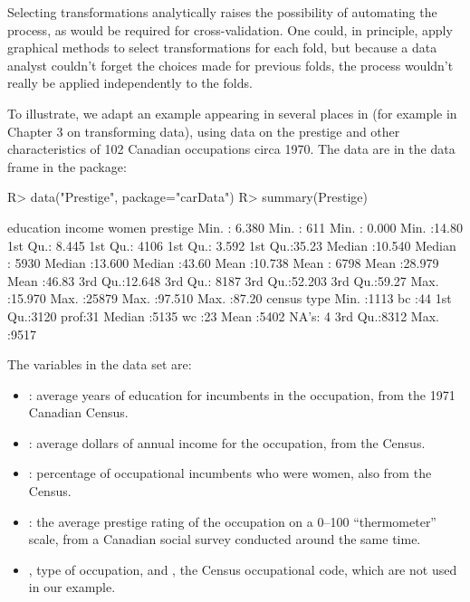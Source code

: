 \documentclass[
]{jss}
\providecommand{\tightlist}{%
  \setlength{\itemsep}{0pt}\setlength{\parskip}{0pt}}
\begin{document}
Selecting transformations analytically raises the possibility of
automating the process, as would be required for cross-validation. One
could, in principle, apply graphical methods to select transformations
for each fold, but because a data analyst couldn't forget the choices
made for previous folds, the process wouldn't really be applied
independently to the folds.

To illustrate, we adapt an example appearing in several places in
\citet{FoxWeisberg:2019} (for example in Chapter 3 on transforming
data), using data on the prestige and other characteristics of 102
Canadian occupations circa 1970. The data are in the 
data frame in the  package:

\begin{CodeChunk}
\begin{CodeInput}
R> data("Prestige", package="carData")
R> summary(Prestige)
\end{CodeInput}
\begin{CodeOutput}
   education          income          women           prestige    
 Min.   : 6.380   Min.   :  611   Min.   : 0.000   Min.   :14.80  
 1st Qu.: 8.445   1st Qu.: 4106   1st Qu.: 3.592   1st Qu.:35.23  
 Median :10.540   Median : 5930   Median :13.600   Median :43.60  
 Mean   :10.738   Mean   : 6798   Mean   :28.979   Mean   :46.83  
 3rd Qu.:12.648   3rd Qu.: 8187   3rd Qu.:52.203   3rd Qu.:59.27  
 Max.   :15.970   Max.   :25879   Max.   :97.510   Max.   :87.20  
     census       type   
 Min.   :1113   bc  :44  
 1st Qu.:3120   prof:31  
 Median :5135   wc  :23  
 Mean   :5402   NA's: 4  
 3rd Qu.:8312            
 Max.   :9517            
\end{CodeOutput}
\end{CodeChunk}

The variables in the  data set are:

\begin{itemize}
\tightlist
\item
  : average years of education for incumbents in the
  occupation, from the 1971 Canadian Census.
\item
  : average dollars of annual income for the occupation,
  from the Census.
\item
  : percentage of occupational incumbents who were women,
  also from the Census.
\item
  : the average prestige rating of the occupation on a
  0--100 ``thermometer'' scale, from a Canadian social survey conducted
  around the same time.
\item
  , type of occupation, and , the Census
  occupational code, which are not used in our example.
\end{itemize}
\end{document}
